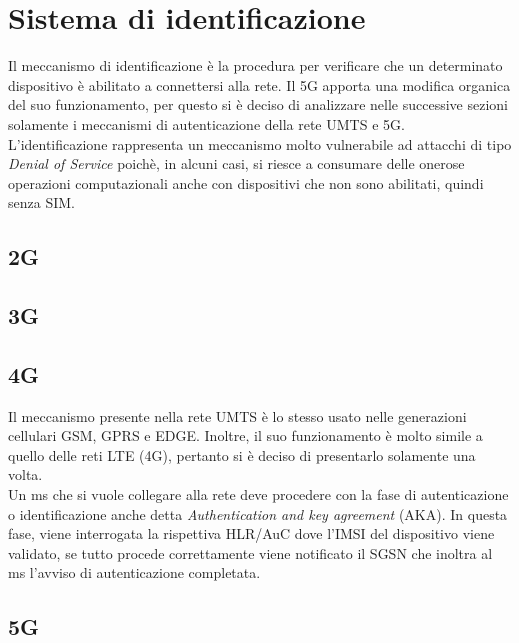 \section{Sistema di identificazione}
Il meccanismo di identificazione è la procedura per verificare che un determinato dispositivo
è abilitato a connettersi alla rete. Il 5G apporta una modifica organica del suo funzionamento, per
questo si è deciso di analizzare nelle successive sezioni solamente i meccanismi di autenticazione della rete
UMTS e 5G.\\
L'identificazione rappresenta un meccanismo molto vulnerabile ad attacchi di tipo \textit{Denial of Service} poichè, 
in alcuni casi, si riesce a consumare delle onerose operazioni computazionali anche con dispositivi che non sono abilitati,
quindi senza SIM.

\subsection{2G}
\subsection{3G}
\subsection{4G}
Il meccanismo presente nella rete UMTS è lo stesso usato nelle generazioni cellulari GSM, GPRS e EDGE. Inoltre, il 
suo funzionamento è molto simile a quello delle reti LTE (4G), pertanto si è deciso di presentarlo solamente una volta.\\
Un \acrshort{ms} che si vuole collegare alla rete deve procedere con la fase di autenticazione o identificazione anche detta \textit{Authentication and key agreement}
(AKA). In questa fase, viene interrogata la rispettiva HLR/AuC dove l'IMSI del dispositivo viene validato, se tutto procede correttamente
viene notificato il SGSN che inoltra al \acrshort{ms} l'avviso di autenticazione completata.

\subsection{5G}